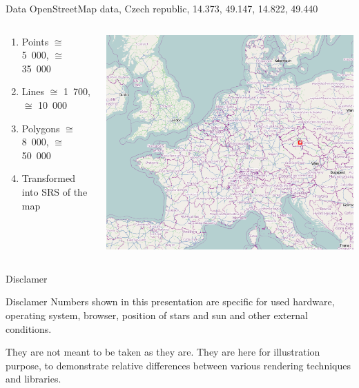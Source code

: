 \documentclass[xcolor=dvipsnames]{beamer}
\begin{document}
\begin{frame}{Data}
OpenStreetMap data, Czech republic, 14.373, 49.147, 14.822, 49.440
\begin{columns}
    \begin{column}{5cm}
        \begin{enumerate}[<+->]
            \item Points $\cong$ 5~000, $\cong$ 35~000
            \item Lines $\cong$ 1~700, $\cong$ 10~000
            \item Polygons $\cong$  8~000, $\cong$ 50~000
            \item Transformed into SRS of the map
        \end{enumerate}
    \end{column}
    \begin{column}{5cm}
        \includegraphics[width=\textwidth]{images/area.png}
    \end{column}
\end{columns}
\end{frame}

\begin{frame}{Disclamer}
\begin{block}{Disclamer}
    Numbers shown in this presentation are specific for used hardware, operating
    system, browser, position of stars and sun and other external conditions.

    \vskip5mm

    They are not meant to be taken as they are. They are here for illustration
    purpose, to demonstrate relative differences between various rendering
    techniques and libraries.
\end{block}
\end{frame}
\end{document}
